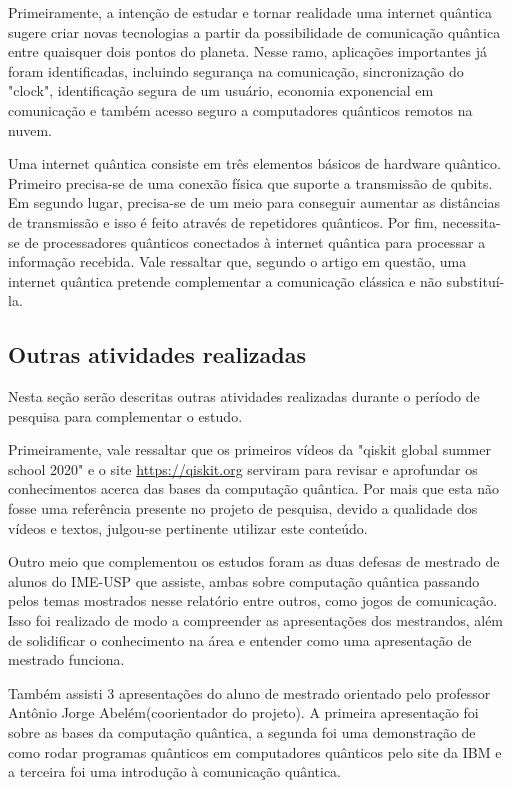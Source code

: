 \documentclass{article}
\begin{document}
        Primeiramente, a intenção de estudar e tornar realidade uma internet quântica sugere criar novas tecnologias a partir da possibilidade de comunicação quântica entre quaisquer dois pontos do planeta. Nesse ramo, aplicações importantes já foram identificadas, incluindo segurança na comunicação, sincronização do "clock", identificação segura de um usuário, economia exponencial em comunicação e também acesso seguro a computadores quânticos remotos na nuvem.
        
        Uma internet quântica consiste em três elementos básicos de hardware quântico. Primeiro precisa-se de uma conexão física que suporte a transmissão de qubits. Em segundo lugar, precisa-se de um meio para conseguir aumentar as distâncias de transmissão e isso é feito através de repetidores quânticos. Por fim, necessita-se de processadores quânticos conectados à internet quântica para processar a informação recebida. Vale ressaltar que, segundo o artigo em questão, uma internet quântica pretende complementar a comunicação clássica e não substituí-la.

    \subsection{Outras atividades realizadas}
        Nesta seção serão descritas outras atividades realizadas durante o período de pesquisa para complementar o estudo.

        Primeiramente, vale ressaltar que os primeiros vídeos da "qiskit global summer school 2020" e o site \href{https://qiskit.org}{https://qiskit.org} serviram para revisar e aprofundar os conhecimentos acerca das bases da computação quântica. Por mais que esta não fosse uma referência presente no projeto de pesquisa, devido a qualidade dos vídeos e textos, julgou-se pertinente utilizar este conteúdo. 

        Outro meio que complementou os estudos foram as duas defesas de mestrado de alunos do IME-USP que assiste, ambas sobre computação quântica passando pelos temas mostrados nesse relatório entre outros, como jogos de comunicação. Isso foi realizado de modo a compreender as apresentações dos mestrandos, além de solidificar o conhecimento na área e entender como uma apresentação de mestrado funciona.

        Também assisti 3 apresentações do aluno de mestrado orientado pelo professor Antônio Jorge Abelém(coorientador do projeto). A primeira apresentação foi sobre as bases da computação quântica, a segunda foi uma demonstração de como rodar programas quânticos em computadores quânticos pelo site da IBM e a terceira foi uma introdução à comunicação quântica.
    
\end{document}
